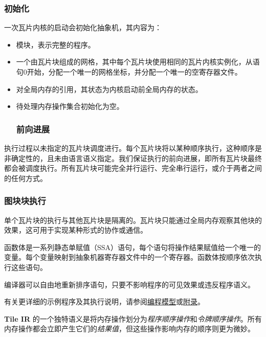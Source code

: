 \documentclass{article}
\begin{document}
\subsubsection{初始化}

一次瓦片内核的启动会初始化抽象机，其内容为：


\begin{itemize}
\item 模块，表示完整的程序。
\item 一个由瓦片块组成的网格，其中每个瓦片块使用相同的瓦片内核实例化，从语句0开始，分配一个唯一的网格坐标，并分配一个唯一的空寄存器文件。
\item 对全局内存的引用，其状态为内核启动前全局内存的状态。
\item 待处理内存操作集合初始化为空。


\subsubsection{前向进展}

\end{itemize}
执行过程以未指定的瓦片块调度进行。每个瓦片块将以某种顺序执行，这种顺序是非确定性的，且未由语言语义指定。我们保证执行的前向进展，即所有瓦片块最终都会被调度执行。所有瓦片块可能完全并行运行、完全串行运行，或介于两者之间的任何方式。



\subsubsection{图块块执行}

单个瓦片块的执行与其他瓦片块是隔离的。瓦片块只能通过全局内存观察其他块的效果，这可用于实现某种形式的协作或通信。


函数体是一系列静态单赋值（SSA）语句，每个语句将操作结果赋值给一个唯一的变量。每个变量映射到抽象机器寄存器文件中的一个寄存器。函数体按顺序依次执行这些语句。

编译器可以自由地重新排序语句，只要不影响程序的可见效果或违反程序语义。


有关更详细的示例程序及其执行说明，请参阅\href{https://docs.nvidia.com/cuda/tile-ir/latest/sections/prog_model.html#section-prog-model}{编程模型}或\href{https://docs.nvidia.com/cuda/tile-ir/latest/sections/appendix.html#section-appendix}{附录}。


\textbf{Tile IR} 的一个独特语义是将内存操作划分为\textit{程序顺序操作}和\textit{令牌顺序操作}。所有内存操作都会立即产生它们的\textit{结果值}，但这些操作影响内存的顺序则更为微妙。
\end{document}
